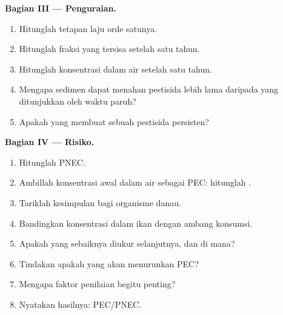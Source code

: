 \begin{problem}
\medskip\noindent\textbf{Bagian III --- Penguraian.}
\begin{enumerate}[resume, beginpenalty=10000]
  \item Hitunglah tetapan laju orde satunya.
  \item Hitunglah fraksi yang tersisa setelah satu tahun.
  \item Hitunglah konsentrasi dalam air setelah satu tahun.
  \item Mengapa sedimen dapat menahan pestisida lebih lama daripada yang ditunjukkan oleh waktu paruh?
  \item Apakah yang membuat sebuah pestisida persisten?
\end{enumerate}

\medskip\noindent\textbf{Bagian IV --- Risiko.}
\begin{enumerate}[resume, beginpenalty=10000]
  \item Hitunglah PNEC.
  \item Ambillah konsentrasi awal dalam air sebagai PEC: hitunglah .
  \item Tariklah kesimpulan bagi organisme danau.
  \item Bandingkan konsentrasi dalam ikan dengan ambang konsumsi.
  \item Apakah yang sebaiknya diukur selanjutnya, dan di mana?
  \item Tindakan apakah yang akan menurunkan PEC?
  \item Mengapa faktor penilaian begitu penting?
  \item Nyatakan hasilnya:  PEC/PNEC.
\end{enumerate}
\end{problem}
